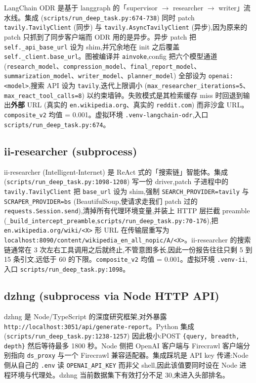 \documentclass[UTF8,a4paper,12pt,oneside]{ctexart}
\begin{document}
LangChain ODR 是基于 langgraph 的「supervisor \(\to\) researcher \(\to\) writer」流水线。集成 (\texttt{scripts/run\_deep\_task.py:674-738}) 同时 patch \texttt{tavily.TavilyClient} (同步) 与 \texttt{tavily.AsyncTavilyClient} (异步),因为原来的 patch 只抓到了同步客户端而 ODR 用的是异步。异步 patch 把 \texttt{self.\_api\_base\_url} 设为 shim,并冗余地在 init 之后覆盖 \texttt{self.\_client.base\_url}。图被编译并 \texttt{ainvoke},config 把六个模型通道 (\texttt{research\_model}、\texttt{compression\_model}、\texttt{final\_report\_model}、\texttt{summarization\_model}、\texttt{writer\_model}、\texttt{planner\_model}) 全部设为 \texttt{openai:<model>},搜索 API 设为 \texttt{tavily},迭代上限调小 (\texttt{max\_researcher\_iterations=5}、\texttt{max\_react\_tool\_calls=8}) 以约束墙钟。失败模式是其检索缓存 miss 时回退到输出\textbf{外部} URL (真实的 \texttt{en.wikipedia.org}、真实的 \texttt{reddit.com}) 而非沙盒 URL。\texttt{composite\_v2} 均值 = 0.001。虚拟环境 \texttt{.venv-langchain-odr},入口 \texttt{scripts/run\_deep\_task.py:674}。

\subsection{ii-researcher (subprocess)}

ii-researcher (Intelligent-Internet) 是 ReAct 式的「搜索链」智能体。集成 (\texttt{scripts/run\_deep\_task.py:1098-1208}) 写一份 driver,patch 子进程中的 \texttt{tavily.TavilyClient} 把 \texttt{base\_url} 设为 shim,强制 \texttt{SEARCH\_PROVIDER=tavily} 与 \texttt{SCRAPER\_PROVIDER=bs} (BeautifulSoup,使请求走我们 patch 过的 \texttt{requests.Session.send}),清掉所有代理环境变量,并装上 HTTP 层拦截 preamble (\texttt{\_build\_intercept\_preamble},\texttt{scripts/run\_deep\_task.py:70-176}),把 \texttt{en.wikipedia.org/wiki/<X>} 形 URL 在传输层重写为 \texttt{localhost:8090/content/wikipedia\_en\_all\_nopic/A/<X>}。ii-researcher 的搜索链通常在 3 次左右工具调用之后就终止,不管意图多长,因此一份报告往往只剩 5 到 15 条引文,远低于 60 的下限。\texttt{composite\_v2} 均值 = 0.001。虚拟环境 \texttt{.venv-ii},入口 \texttt{scripts/run\_deep\_task.py:1098}。

\subsection{dzhng (subprocess via Node HTTP API)}

dzhng 是 Node/TypeScript 的深度研究框架,对外暴露 \texttt{http://localhost:3051/api/generate-report}。Python 集成 (\texttt{scripts/run\_deep\_task.py:1238-1257}) 因此极小:POST \texttt{\{query, breadth, depth\}} 然后等待最多 1800 秒。Node 侧把 OpenAI 客户端与 Firecrawl 客户端分别指向 \texttt{ds\_proxy} 与一个 Firecrawl 兼容适配器。集成踩坑是 API key 传递:Node 侧从自己的 \texttt{.env} 读 \texttt{OPENAI\_API\_KEY} 而非父 shell,因此该值要同时设在 Node 进程环境与代理处。dzhng 当前数据集下有效打分不足 30,未进入头部排名。
\end{document}
